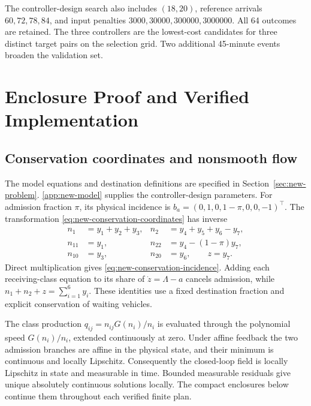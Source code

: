 \documentclass[preprint,12pt]{elsarticle}
\newcommand{\appref}[1]{\ref{#1}}
\begin{document}
The controller-design search also includes $(18,20)$, reference arrivals
$60,72,78,84$, and input penalties $3000,30000,300000,3000000$.
All 64 outcomes are retained. The three controllers are the lowest-cost candidates for three
distinct target pairs on the selection grid. Two additional 45-minute
events broaden the validation set.

\section{Enclosure Proof and Verified Implementation}
\label{app:new-enclosure-proof}

\subsection{Conservation coordinates and nonsmooth flow}

The model equations and destination definitions are specified in
Section~\ref{sec:new-problem}. \appref{app:new-model} supplies the controller-design
parameters. For admission fraction $\pi$, its physical incidence is
$b_a=(0,1,0,1-\pi,0,0,-1)^\top$. The transformation
\eqref{eq:new-conservation-coordinates} has inverse
\begin{equation}
 \begin{aligned}
 n_1&=y_1+y_2+y_3,&
 n_2&=y_4+y_5+y_6-y_7,\\
 n_{11}&=y_1,&n_{22}&=y_4-(1-\pi)y_7,\\
 n_{10}&=y_3,&n_{20}&=y_6,\qquad z=y_7.
 \end{aligned}
 \label{eq:new-inverse-coordinates}
\end{equation}
Direct multiplication gives \eqref{eq:new-conservation-incidence}. Adding
each receiving-class equation to its share of $\dot z=\Lambda-a$ cancels
admission, while $n_1+n_2+z=\sum_{i=1}^{6}y_i$. These identities use a fixed
destination fraction and explicit conservation of waiting vehicles.

The class production $q_{ij}=n_{ij}G(n_i)/n_i$ is evaluated through the
polynomial speed $G(n_i)/n_i$, extended continuously at zero. Under affine
feedback the two admission branches are affine in the physical state, and
their minimum is continuous and locally Lipschitz. Consequently the
closed-loop field is locally Lipschitz in state and measurable in time.
Bounded measurable residuals give unique absolutely continuous solutions
locally. The compact enclosures below continue them throughout each verified
finite plan.
\end{document}
